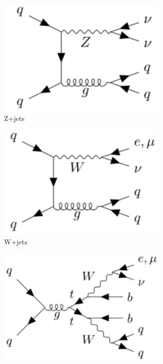 \documentclass[12pt]{article}
\begin{document}
\begin{figure}[H]
     \centering
     \begin{subfigure}[b]{0.4\textwidth}
         \centering
         \includegraphics[width=0.9\textwidth]{figures/Zjet_feynman.png}
         \caption[]{Z+jets}
         \label{fig:zjets}
     \end{subfigure}
     \hfill
     \begin{subfigure}[b]{0.4\textwidth}
         \centering
         \includegraphics[width=0.9\textwidth]{figures/Wjet_feynman.png}
         \caption[]{W+jets}
         \label{fig:wjets}
     \end{subfigure}
     \hfill
     \begin{subfigure}[b]{0.4\textwidth}
         \centering
         \includegraphics[width=0.9\textwidth]{figures/ttbar_feynman.png}

\end{subfigure}
\end{figure}
\end{document}
